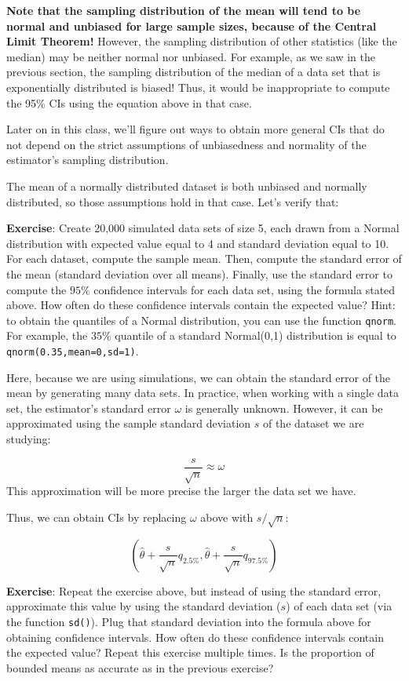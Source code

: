 \documentclass[
]{book}
\begin{document}
\textbf{Note that the sampling distribution of the mean will tend to be normal and unbiased for large sample sizes, because of the Central Limit Theorem!} However, the sampling distribution of other statistics (like the median) may be neither normal nor unbiased. For example, as we saw in the previous section, the sampling distribution of the median of a data set that is exponentially distributed is biased! Thus, it would be inappropriate to compute the 95\% CIs using the equation above in that case.

Later on in this class, we'll figure out ways to obtain more general CIs that do not depend on the strict assumptions of unbiasedness and normality of the estimator's sampling distribution.

The mean of a normally distributed dataset is both unbiased and normally distributed, so those assumptions hold in that case. Let's verify that:

\textbf{Exercise}: Create 20,000 simulated data sets of size 5, each drawn from a Normal distribution with expected value equal to 4 and standard deviation equal to 10. For each dataset, compute the sample mean. Then, compute the standard error of the mean (standard deviation over all means). Finally, use the standard error to compute the \(95\%\) confidence intervals for each data set, using the formula stated above. How often do these confidence intervals contain the expected value? Hint: to obtain the quantiles of a Normal distribution, you can use the function \texttt{qnorm}. For example, the \(35\%\) quantile of a standard Normal(0,1) distribution is equal to \texttt{qnorm(0.35,mean=0,sd=1)}.

Here, because we are using simulations, we can obtain the standard error of the mean by generating many data sets. In practice, when working with a single data set, the estimator's standard error \(\omega\) is generally unknown. However, it can be approximated using the sample standard deviation \(s\) of the dataset we are studying:

\[\frac{s}{\sqrt{n}} \approx \omega\]
This approximation will be more precise the larger the data set we have.

Thus, we can obtain CIs by replacing \(\omega\) above with \(s/\sqrt{n}\):

\[(\hat{\theta} + \frac{s}{\sqrt{n}}q_{2.5\%}, \hat{\theta} + \frac{s}{\sqrt{n}}q_{97.5\%})\]

\textbf{Exercise}: Repeat the exercise above, but instead of using the standard error, approximate this value by using the standard deviation (\(s\)) of each data set (via the function \texttt{sd()}). Plug that standard deviation into the formula above for obtaining confidence intervals. How often do these confidence intervals contain the expected value? Repeat this exercise multiple times. Is the proportion of bounded means as accurate as in the previous exercise?
\end{document}
